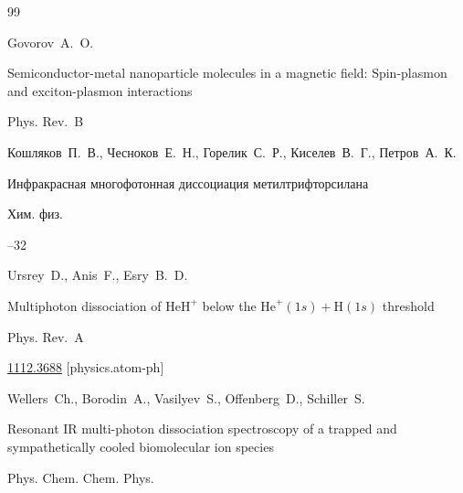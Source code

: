 \begin{thebibliography}{99}

\by Govorov~A.~O.

\paper Semiconductor-metal nanoparticle molecules in a magnetic field: Spin-plasmon and exciton-plasmon interactions 

\jour Phys. Rev.~B









\by Кошляков~П.~В., Чесноков~Е.~Н., Горелик~С.~Р., Киселев~В.~Г., Петров~А.~К. 

\paper Инфракрасная многофотонная диссоциация метилтрифторсилана 

\jour Хим. физ.




--32





\by Ursrey~D., Anis~F., Esry~B.~D. 

\paper Multiphoton dissociation of $\text{HeH}^{+}$ below the $\text{He}^+(1s) + \text{H}(1s)$ threshold

\jour Phys. Rev.~A





\arxiv \href{http://arxiv.org/abs/1112.3688}{1112.3688} [physics.atom-ph]




\by Wellers~Ch., Borodin~A., Vasilyev~S., Offenberg~D., Schiller~S.

\paper Resonant IR multi-photon dissociation spectroscopy of a trapped and sympathetically cooled biomolecular ion species 

\jour Phys. Chem. Chem. Phys. 




\end{thebibliography}
